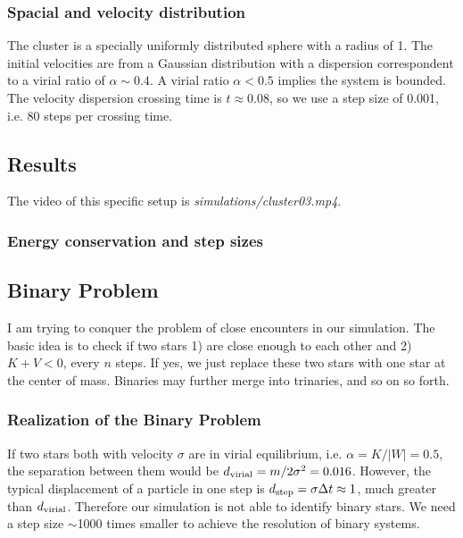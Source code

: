\subsubsection*{Spacial and velocity distribution}
The cluster is a specially uniformly distributed sphere with a radius of 1. The initial 
velocities are from a  Gaussian distribution with a dispersion correspondent to a virial ratio 
of $ \alpha \sim 0.4 $. A virial ratio $ \alpha < 0.5 $ implies the system is bounded. The 
velocity dispersion crossing time is $ t \approx 0.08 $, so we use a step size of 0.001, i.e. 
80 steps per crossing time.

\subsection*{Results}
The video of this specific setup is \textit{simulations/cluster03.mp4}.
\subsubsection{Energy conservation and step sizes}



\subsection*{Binary Problem}
I am trying to conquer the problem of close encounters in our simulation.
The basic idea is to check if two stars 1) are close enough to each other and 2) $ K + V < 0 
$, every $ n $ steps. If yes, we just replace these two stars with one star at the center 
of mass. Binaries may further merge into trinaries, and so on so forth.


\subsubsection*{Realization of the Binary Problem}
If two stars both with velocity $ \sigma $ are in virial equilibrium, i.e. $ \alpha = K/|W| = 0.5 
$, the separation between them would be $ d_{\rm virial} = m /2 \sigma^2 = 0.016 $. 
However, the typical displacement of a particle in one step is $ d_{\rm step} = \sigma \Delta 
t \approx 1 $, much greater than $ d_{\rm virial} $. Therefore our simulation is not able to 
identify binary stars. We need a step size $ \sim $1000 times smaller to achieve the 
resolution of binary systems.

